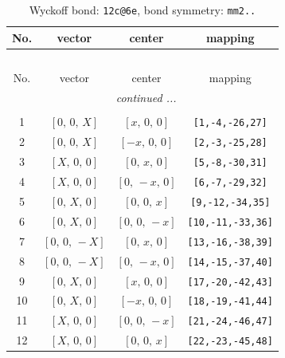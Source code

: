 \documentclass[fleqn,8pt]{jsarticle}
\begin{document}
\renewcommand{\arraystretch}{1.2}
\begin{longtable}{cccc}
\caption{Wyckoff bond: {\tt 12c@6e}, bond symmetry: {\tt mm2..}}
 \\
 \hline \hline
No. & vector & center & mapping \\ \hline \endfirsthead

\multicolumn{3}{l}{\tablename\ \thetable{}} \\
 \hline \hline
No. & vector & center & mapping \\ \hline \endhead

 \hline \hline
\multicolumn{3}{r}{\footnotesize\it continued ...} \\ \endfoot

 \hline \hline
\multicolumn{3}{r}{} \\ \endlastfoot

1 & $\left[ 0,\, 0,\, X \right]$ & $\left[ x,\, 0,\, 0 \right]$ & {\tt [1,-4,-26,27]} \\ \hline
2 & $\left[ 0,\, 0,\, X \right]$ & $\left[ - x,\, 0,\, 0 \right]$ & {\tt [2,-3,-25,28]} \\ \hline
3 & $\left[ X,\, 0,\, 0 \right]$ & $\left[ 0,\, x,\, 0 \right]$ & {\tt [5,-8,-30,31]} \\ \hline
4 & $\left[ X,\, 0,\, 0 \right]$ & $\left[ 0,\, - x,\, 0 \right]$ & {\tt [6,-7,-29,32]} \\ \hline
5 & $\left[ 0,\, X,\, 0 \right]$ & $\left[ 0,\, 0,\, x \right]$ & {\tt [9,-12,-34,35]} \\ \hline
6 & $\left[ 0,\, X,\, 0 \right]$ & $\left[ 0,\, 0,\, - x \right]$ & {\tt [10,-11,-33,36]} \\ \hline
7 & $\left[ 0,\, 0,\, - X \right]$ & $\left[ 0,\, x,\, 0 \right]$ & {\tt [13,-16,-38,39]} \\ \hline
8 & $\left[ 0,\, 0,\, - X \right]$ & $\left[ 0,\, - x,\, 0 \right]$ & {\tt [14,-15,-37,40]} \\ \hline
9 & $\left[ 0,\, X,\, 0 \right]$ & $\left[ x,\, 0,\, 0 \right]$ & {\tt [17,-20,-42,43]} \\ \hline
10 & $\left[ 0,\, X,\, 0 \right]$ & $\left[ - x,\, 0,\, 0 \right]$ & {\tt [18,-19,-41,44]} \\ \hline
11 & $\left[ X,\, 0,\, 0 \right]$ & $\left[ 0,\, 0,\, - x \right]$ & {\tt [21,-24,-46,47]} \\ \hline
12 & $\left[ X,\, 0,\, 0 \right]$ & $\left[ 0,\, 0,\, x \right]$ & {\tt [22,-23,-45,48]} \\
\end{longtable}
\end{document}
